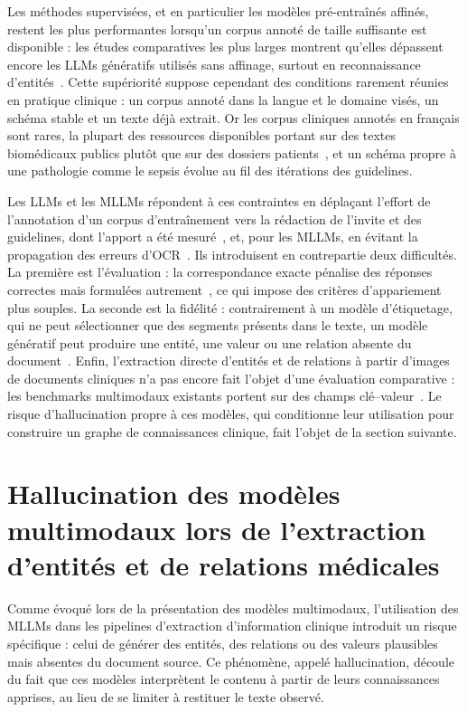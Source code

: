 Les méthodes supervisées, et en particulier les modèles pré-entraînés affinés, restent les plus performantes lorsqu'un corpus annoté de taille suffisante est disponible : les études comparatives les plus larges montrent qu'elles dépassent encore les LLMs génératifs utilisés sans affinage, surtout en reconnaissance d'entités~\cite{gutierrez2022gpt3bioie, chen2025benchmarking}. Cette supériorité suppose cependant des conditions rarement réunies en pratique clinique : un corpus annoté dans la langue et le domaine visés, un schéma stable et un texte déjà extrait. Or les corpus cliniques annotés en français sont rares, la plupart des ressources disponibles portant sur des textes biomédicaux publics plutôt que sur des dossiers patients~\cite{neveol2014quaero, touchent2024camembertbio}, et un schéma propre à une pathologie comme le sepsis évolue au fil des itérations des guidelines.

Les LLMs et les MLLMs répondent à ces contraintes en déplaçant l'effort de l'annotation d'un corpus d'entraînement vers la rédaction de l'invite et des guidelines, dont l'apport a été mesuré~\cite{hu2024clinicalner, sainz2024gollie}, et, pour les MLLMs, en évitant la propagation des erreurs d'OCR~\cite{zhang2025ocrhindersrag}. Ils introduisent en contrepartie deux difficultés. La première est l'évaluation : la correspondance exacte pénalise des réponses correctes mais formulées autrement~\cite{wadhwa2023revisiting}, ce qui impose des critères d'appariement plus souples. La seconde est la fidélité : contrairement à un modèle d'étiquetage, qui ne peut sélectionner que des segments présents dans le texte, un modèle génératif peut produire une entité, une valeur ou une relation absente du document~\cite{wang2025gptner, chen2025benchmarking}. Enfin, l'extraction directe d'entités et de relations à partir d'images de documents cliniques n'a pas encore fait l'objet d'une évaluation comparative : les benchmarks multimodaux existants portent sur des champs clé--valeur~\cite{liu2024ocrbench, ji2026unikie, shang2025medrepbench}. Le risque d'hallucination propre à ces modèles, qui conditionne leur utilisation pour construire un graphe de connaissances clinique, fait l'objet de la section suivante.

\section{Hallucination des modèles multimodaux lors de l'extraction d'entités et de relations médicales}

Comme évoqué lors de la présentation des modèles multimodaux, l'utilisation des MLLMs dans les pipelines d'extraction d'information clinique introduit un risque spécifique : celui de générer des entités, des relations ou des valeurs plausibles mais absentes du document source. Ce phénomène, appelé hallucination, découle du fait que ces modèles interprètent le contenu à partir de leurs connaissances apprises, au lieu de se limiter à restituer le texte observé.

